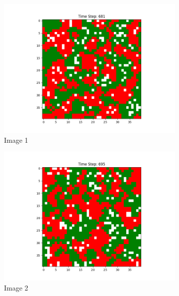 \documentclass[12pt]{article}
\begin{document}
	\begin{figure}[h]
		\centering
		\begin{subfigure}{0.2\textwidth}
			\includegraphics[width=\linewidth]{final_cluster_w5b10.png}
			\caption{Image 1}
		\end{subfigure}\hspace{0.02\textwidth}
		\begin{subfigure}{0.2\textwidth}
			\includegraphics[width=\linewidth]{final_cluster_w10b10.png}
			\caption{Image 2}
		\end{subfigure}\hspace{0.02\textwidth}
		\begin{subfigure}{0.2\textwidth}

\end{subfigure}
\end{figure}
\end{document}
